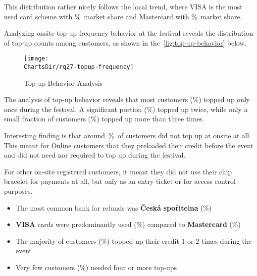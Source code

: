 This distribution rather nicely follows the local trend, where VISA is the most used card scheme with \%~market share and Mastercard with \%~market share\cite{spbk_czech_profil_karty}.


Analyzing onsite top-up frequency behavior at the festival reveals the distribution of top-up counts among customers, as shown in the~\autoref{fig:top-up-behavior} below.

\begin{figure}[H]
	\centering
	\texttt{[image: \\ChartsDir/rq27-topup-frequency]}
	\caption{ Top-up Behavior Analysis}
	\label{fig:top-up-behavior}
	\source
\end{figure}

The analysis of top-up behavior reveals that most customers (\%) topped up only once during the festival.
A significant portion (\%) topped up twice, while only a small fraction of customers (\%) topped up more than three times.

Interesting finding is that around~\%~of customers did not top up at onsite at all.
This meant for Online customers that they preloaded their credit before the event and did not need nor required to top up during the festival.

For other on-site registered customers, it meant they did not use their chip bracelet for payments at all, but only as an entry ticket or for access control purposes.

\begin{keytakeaways}
	\begin{itemize}
		\item The most common bank for refunds was \textbf{Česká spořitelna} (\%)
		\item \textbf{VISA} cards were predominantly used (\%) compared to \textbf{Mastercard} (\%)
		\item The majority of customers (\%) topped up their credit 1 or 2 times during the event
		\item Very few customers (\%) needed four or more top-ups
	\end{itemize}
\end{keytakeaways}


